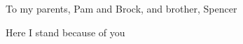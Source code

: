 
\cleartorecto %
\thispagestyle{plain} %
\begin{center}
To my parents, Pam and Brock, and brother, Spencer

Here I stand because of you
\end{center}
